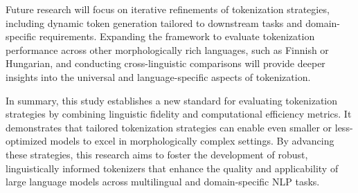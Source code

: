 Future research will focus on iterative refinements of tokenization strategies, including dynamic token generation tailored to downstream tasks and domain-specific requirements. Expanding the framework to evaluate tokenization performance across other morphologically rich languages, such as Finnish or Hungarian, and conducting cross-linguistic comparisons will provide deeper insights into the universal and language-specific aspects of tokenization.

In summary, this study establishes a new standard for evaluating tokenization strategies by combining linguistic fidelity and computational efficiency metrics. It demonstrates that tailored tokenization strategies can enable even smaller or less-optimized models to excel in morphologically complex settings. By advancing these strategies, this research aims to foster the development of robust, linguistically informed tokenizers that enhance the quality and applicability of large language models across multilingual and domain-specific NLP tasks.